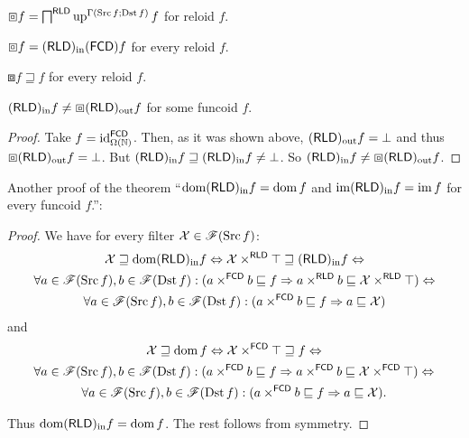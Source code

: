 \begin{defn}
$\boxbox f=\bigsqcap^{\mathsf{RLD}}\operatorname{up}^{\Gamma(\operatorname{Src} f;\operatorname{Dst} f)}f$
for reloid $f$.\end{defn}
\begin{conjecture}
$\boxbox f=(\mathsf{RLD})_{\mathrm{in}} (\mathsf{FCD}) f$ for every reloid $f$.
\end{conjecture}
\begin{obvious}
$\boxbox f\sqsupseteq f$ for every reloid $f$.\end{obvious}
\begin{example}
$(\mathsf{RLD})_{\mathrm{in}} f\neq\boxbox(\mathsf{RLD})_{\mathrm{out}} f$ for some funcoid
$f$.\end{example}
\begin{proof}
Take $f=\operatorname{id}_{\Omega(\mathbb{N})}^{\mathsf{FCD}}$. Then, as it was
shown above, $(\mathsf{RLD})_{\mathrm{out}} f=\bot$ and thus $\boxbox(\mathsf{RLD})_{\mathrm{out}} f=\bot$.
But $(\mathsf{RLD})_{\mathrm{in}} f\sqsupseteq(\mathsf{RLD})_{\mathrm{in}} f\neq\bot$. So $(\mathsf{RLD})_{\mathrm{in}} f\neq\boxbox(\mathsf{RLD})_{\mathrm{out}} f$.\end{proof}
Another proof of the theorem ``$\operatorname{dom}(\mathsf{RLD})_{\mathrm{in}} f=\operatorname{dom} f$ and $\operatorname{im}(\mathsf{RLD})_{\mathrm{in}} f=\operatorname{im} f$
for every funcoid $f$.'':
\begin{proof}
We have for every filter $\mathcal{X}\in\mathscr{F}(\operatorname{Src} f)$:
\begin{multline*}
\mathcal{X}\sqsupseteq\operatorname{dom}(\mathsf{RLD})_{\mathrm{in}} f\Leftrightarrow\mathcal{X}\times^{\mathsf{RLD}}\top\sqsupseteq(\mathsf{RLD})_{\mathrm{in}} f\Leftrightarrow\\
\forall a\in\mathscr{F}(\operatorname{Src} f),b\in\mathscr{F}(\operatorname{Dst} f):(a\times^{\mathsf{FCD}}b\sqsubseteq f\Rightarrow a\times^{\mathsf{RLD}}b\sqsubseteq\mathcal{X}\times^{\mathsf{RLD}}\top)\Leftrightarrow\\
\forall a\in\mathscr{F}(\operatorname{Src} f),b\in\mathscr{F}(\operatorname{Dst} f):(a\times^{\mathsf{FCD}}b\sqsubseteq f\Rightarrow a\sqsubseteq\mathcal{X})
\end{multline*}
and 
\begin{multline*}
\mathcal{X}\sqsupseteq\operatorname{dom} f\Leftrightarrow\mathcal{X}\times^{\mathsf{FCD}}\top\sqsupseteq f\Leftrightarrow\\
\forall a\in\mathscr{F}(\operatorname{Src} f),b\in\mathscr{F}(\operatorname{Dst} f):(a\times^{\mathsf{FCD}}b\sqsubseteq f\Rightarrow a\times^{\mathsf{FCD}}b\sqsubseteq\mathcal{X}\times^{\mathsf{FCD}}\top)\Leftrightarrow\\
\forall a\in\mathscr{F}(\operatorname{Src} f),b\in\mathscr{F}(\operatorname{Dst} f):(a\times^{\mathsf{FCD}}b\sqsubseteq f\Rightarrow a\sqsubseteq\mathcal{X}).
\end{multline*}


Thus $\operatorname{dom}(\mathsf{RLD})_{\mathrm{in}} f=\operatorname{dom} f$. The rest follows from symmetry.\end{proof}

